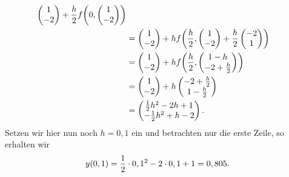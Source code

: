 \documentclass{exercise}
\begin{document}
\begin{enumerate}
\begin{align*}
{\begin{pmatrix}
                1\\
                -2
            \end{pmatrix} + \frac{h}{2}f\parentheses*{0, \begin{pmatrix}
                1\\
                -2
            \end{pmatrix}}}\\
            &= \begin{pmatrix}
                1\\
                -2
            \end{pmatrix} + hf\parentheses*{\frac{h}{2}, \begin{pmatrix}
                1\\
                -2
            \end{pmatrix} + \frac{h}{2}\begin{pmatrix}
                -2\\
                1
            \end{pmatrix}}\\
            &= \begin{pmatrix}
                1\\
                -2
            \end{pmatrix} + hf\parentheses*{\frac{h}{2}, \begin{pmatrix}
                1 - h\\
                -2 + \frac{h}{2}
            \end{pmatrix}}\\
            &= \begin{pmatrix}
                1\\
                -2
            \end{pmatrix} + h\begin{pmatrix}
                -2 + \frac{h}{2}\\
                1 - \frac{h}{2}
            \end{pmatrix}\\
            &= \begin{pmatrix}
                \frac{1}{2}h^2 - 2h + 1\\
                -\frac{1}{2}h^2 + h - 2
            \end{pmatrix}.
        \end{align*}
        Setzen wir hier nun noch \(h = 0,1\) ein und betrachten nur die erste Zeile, so erhalten wir
        \[
            y\parentheses*{0,1} = \frac{1}{2} \cdot 0,1^2 - 2 \cdot 0,1 + 1 = 0,805.
\]
\end{enumerate}
\end{document}
